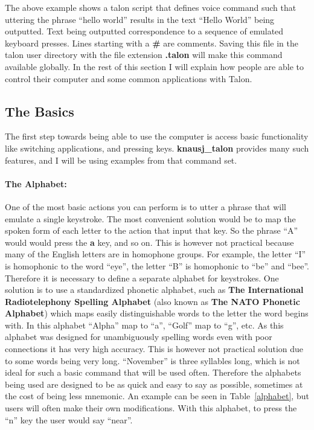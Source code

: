 \documentclass[../thesis.tex]{subfiles}
\begin{document}
The above example shows a talon script that defines voice command such that uttering the phrase ``hello world''
results in the text ``Hello World'' being outputted.
Text being outputted correspondence to
a sequence of emulated keyboard presses.
Lines starting with a \textbf{\#} are comments.
Saving this file in the talon user directory with the file extension \textbf{.talon} will make this command available globally.
In the rest of this section I will explain how people are able to control their computer and some common applications with Talon.

\subsection{The Basics}
The first step towards being able to use the computer is access basic functionality like switching applications, and pressing keys.
\textbf{knausj\_talon} provides many such features, and I will be using examples from that command set.

\paragraph{The Alphabet:}
One of the most basic actions you can perform is to utter a phrase that will emulate a single keystroke.
The most convenient solution would be to map the spoken form of each letter to the action that input that key.
So the phrase ``A'' would would press the \textbf{a} key, and so on.
This is however not practical because many of the English letters are in homophone groups.
For example, the letter ``I'' is homophonic to the word ``eye'', the letter ``B'' is homophonic to ``be'' and ``bee''.
Therefore it is necessary to define a separate alphabet for keystrokes.
One solution is to use a standardized phonetic alphabet, such as \textbf{The International Radiotelephony Spelling Alphabet}
(also known as \textbf{The NATO Phonetic Alphabet}) which maps easily distinguishable words to the letter the word begins with.
In this alphabet ``Alpha'' map to ``a'', ``Golf'' map to ``g'', etc.
As this alphabet was designed for unambiguously spelling words even with poor connections it has very high accuracy.
This is however not practical solution due to some words being very long. ``November'' is three syllables long, which
is not ideal for such a basic command that will be used often.
Therefore the alphabets being used are designed to be as quick and easy to say as possible, sometimes at the cost of
being less mnemonic. An example can be seen in Table~\ref{alphabet}, but users will often make their own
modifications. With this alphabet, to press the ``n'' key the user would say ``near''.
\end{document}

